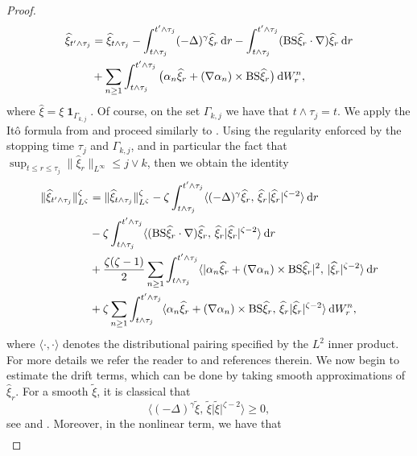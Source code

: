 \documentclass[11pt, a4paper,oneside, reqno]{amsart}
\theoremstyle{remark} %
\theoremstyle{definition} %
\numberwithin{theorem}{section}
\numberwithin{equation}{section}
\newcommand{\abs}[1]{\vert #1 \vert}
\newcommand{\inner}[2]{\langle #1,\, #2 \rangle}
\newcommand{\BS}{{\rm BS}}
\newcommand{\del}{\Delta}
\newcommand{\grad}{\nabla}
\newcommand{\gam}{\gamma}
\renewcommand{\tilde}[1]{\widetilde{#1}}
\renewcommand{\hat}[1]{\widehat{#1}}
\newcommand{\dd}{\hspace{2pt}\mathrm{d}}
\DeclareMathOperator{\ind}{\mathbf{1}}
\begin{document}
\begin{proof}
\begin{align*}
    \hat{\xi}_{t' \wedge \tau_j}  &= \hat{\xi}_{t \wedge \tau_j} - \int_{t \wedge \tau_j}^{t'\wedge\tau_j}(-\del)^\gam \hat{\xi}_r\dd r -\int_{t \wedge \tau_j}^{t'\wedge\tau_j}(\BS\hat{\xi}_r \cdot \grad)\hat{\xi}_r \dd r\\ &+ \sum_{n \geq 1} \int_{t \wedge \tau_j}^{t'\wedge\tau_j}\big(\alpha_n\hat{\xi}_r + (\nabla \alpha_n) \times \BS\hat{\xi}_r\big)\dd W^n_r,
\end{align*}
where $\hat{\xi} = \xi\ind_{\Gamma_{k,j}}$. Of course, on the set $\Gamma_{k,j}$ we have that $t \wedge \tau_j = t$. We apply the It\^{o} formula from \cite[Proposition A.1]{debussche2016degenerate} and proceed similarly to \cite[Proposition 5.1]{debussche2016degenerate}. Using the regularity enforced by the stopping time $\tau_j$ and $\Gamma_{k,j}$, and in particular the fact that $\sup_{t \leq r \leq \tau_j}\|\hat{\xi}_r\|_{L^{\infty}} \leq j \vee k$, then we obtain the identity
\begin{align*}
    \|\hat{\xi}_{t' \wedge \tau_j}\|_{L^{\zeta}}^{\zeta}  &= \|\hat{\xi}_{t \wedge \tau_j}\|_{L^{\zeta}}^{\zeta} - \zeta\int_{t \wedge \tau_j}^{t'\wedge\tau_j}\inner{(-\del)^\gam \hat{\xi}_r}{\hat{\xi}_r|\hat{\xi}_r|^{\zeta-2}}\dd r\\ &-\zeta\int_{t \wedge \tau_j}^{t'\wedge\tau_j}\inner{(\BS\hat{\xi}_r \cdot \grad)\hat{\xi}_r}{\hat{\xi}_r\abs{\hat{\xi}_r}^{\zeta-2}} \dd r\\ &+ \frac{\zeta(\zeta-1)}{2} \sum_{n \geq 1} \int_{t \wedge \tau_j}^{t'\wedge\tau_j}\inner{\abs{\alpha_n\hat{\xi}_r + (\nabla \alpha_n) \times \BS\hat{\xi}_r}^2}{\abs{\hat{\xi}_r}^{\zeta-2}}\dd r\\ &+
    \zeta \sum_{n \geq 1} \int_{t \wedge \tau_j}^{t'\wedge\tau_j}\inner{\alpha_n\hat{\xi}_r + (\nabla \alpha_n) \times \BS\hat{\xi}_r}{\hat{\xi}_r\abs{\hat{\xi}_r}^{\zeta-2}}\dd W^n_r,
\end{align*}
where $\langle\cdot, \cdot\rangle$ denotes the distributional pairing specified by the $L^2$ inner product. For more details we refer the reader to \cite[Lemma 8.21]{AV25_survey} and references therein. We now begin to estimate the drift terms, which can be done by taking smooth approximations of $\hat{\xi}_r$. For a smooth $\tilde{\xi}$, it is classical that
$$\inner{(-\del)^\gam \tilde{\xi}}{\tilde{\xi}\abs{\tilde{\xi}}^{\zeta-2}} \geq 0 ,$$
see \cite[Proposition II.3.23 \& Example II.3.26]{engel2000one} and \cite[Lemma 2.1]{Pr17}. Moreover, in the nonlinear term, we have that
\begin{align*}

\end{align*}
\end{proof}
\end{document}
